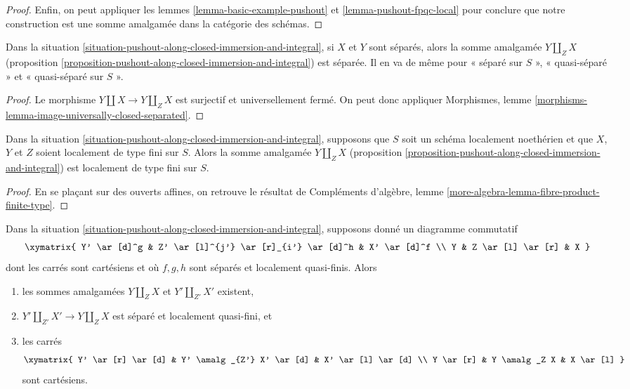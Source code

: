 \begin{proof}
\medskip\noindent
Enfin, on peut appliquer les lemmes \ref{lemma-basic-example-pushout} et
\ref{lemma-pushout-fpqc-local} pour conclure que notre construction est une somme amalgamée
dans la catégorie des schémas.
\end{proof}

\begin{lemma}
\label{lemma-pushout-separated}
Dans la situation \ref{situation-pushout-along-closed-immersion-and-integral},
si $X$ et $Y$ sont séparés, alors la somme amalgamée $Y \amalg_Z X$
(proposition \ref{proposition-pushout-along-closed-immersion-and-integral})
est séparée. Il en va de même pour « séparé sur $S$ », « quasi-séparé » et
« quasi-séparé sur $S$ ».
\end{lemma}

\begin{proof}
Le morphisme $Y \amalg X \to Y \amalg_Z X$ est surjectif
et universellement fermé. On peut donc appliquer
Morphismes, lemme \ref{morphisms-lemma-image-universally-closed-separated}.
\end{proof}

\begin{lemma}
\label{lemma-pushout-finite-type}
Dans la situation \ref{situation-pushout-along-closed-immersion-and-integral},
supposons que $S$ soit un schéma localement noethérien et que $X$, $Y$ et $Z$
soient localement de type fini sur $S$. Alors la somme amalgamée $Y \amalg_Z X$
(proposition \ref{proposition-pushout-along-closed-immersion-and-integral})
est localement de type fini sur $S$.
\end{lemma}

\begin{proof}
En se plaçant sur des ouverts affines, on retrouve le résultat de
Compléments d'algèbre, lemme \ref{more-algebra-lemma-fibre-product-finite-type}.
\end{proof}

\begin{lemma}
\label{lemma-pushout-functor}
Dans la situation \ref{situation-pushout-along-closed-immersion-and-integral},
supposons donné un diagramme commutatif
$$
\xymatrix{
Y' \ar[d]^g & Z' \ar[l]^{j'} \ar[r]_{i'} \ar[d]^h & X' \ar[d]^f \\
Y & Z \ar[l] \ar[r] & X
}
$$
dont les carrés sont cartésiens et où $f, g, h$ sont séparés et localement quasi-finis. Alors
\begin{enumerate}
\item les sommes amalgamées $Y \amalg_Z X$ et $Y' \amalg_{Z'} X'$ existent,
\item $Y' \amalg_{Z'} X' \to Y \amalg_Z X$ est
séparé et localement quasi-fini, et
\item les carrés
$$
\xymatrix{
Y' \ar[r] \ar[d] & Y' \amalg_{Z'} X' \ar[d] & X' \ar[l] \ar[d] \\
Y \ar[r] & Y \amalg_Z X & X \ar[l]
}
$$
sont cartésiens.
\end{enumerate}
\end{lemma}

